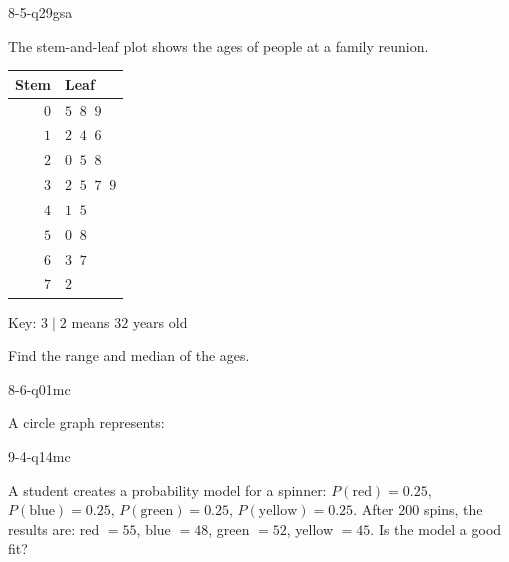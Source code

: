 \begin{practiceQuestion}{8-5-q29}{gsa}
\begin{questionText}
The stem-and-leaf plot shows the ages of people at a family reunion.

\begin{center}
\begin{tabular}{r|l}
\textbf{Stem} & \textbf{Leaf} \\
\hline
$0$ & $5\;\;8\;\;9$ \\
$1$ & $2\;\;4\;\;6$ \\
$2$ & $0\;\;5\;\;8$ \\
$3$ & $2\;\;5\;\;7\;\;9$ \\
$4$ & $1\;\;5$ \\
$5$ & $0\;\;8$ \\
$6$ & $3\;\;7$ \\
$7$ & $2$
\end{tabular}

Key: $3 \mid 2$ means $32$ years old
\end{center}

Find the range and median of the ages.
\end{questionText}
\end{practiceQuestion}

\begin{practiceQuestion}{8-6-q01}{mc}
\begin{questionText}
A circle graph represents:
\end{questionText}
\end{practiceQuestion}

\begin{practiceQuestion}{9-4-q14}{mc}
\begin{questionText}
A student creates a probability model for a spinner: $P(\text{red}) = 0.25$, $P(\text{blue}) = 0.25$, $P(\text{green}) = 0.25$, $P(\text{yellow}) = 0.25$. After $200$ spins, the results are: red $= 55$, blue $= 48$, green $= 52$, yellow $= 45$. Is the model a good fit?
\end{questionText}
\end{practiceQuestion}

